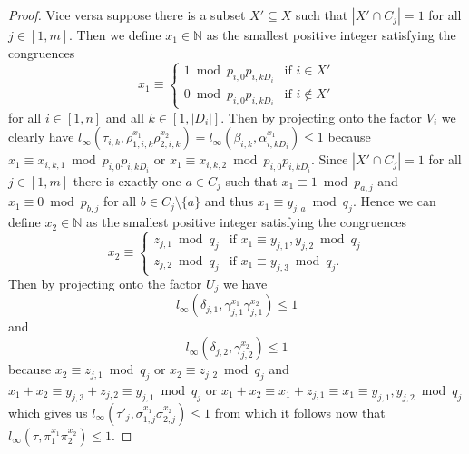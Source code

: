 \documentclass{article}
\begin{document}
\begin{proof}
Vice versa suppose there is a subset $X' \subseteq X$ such that $|X' \cap C_j| = 1$ for all $j \in [1,m]$. Then we define $x_1 \in \mathbb{N}$ as the smallest positive integer satisfying the congruences
\begin{displaymath}
x_1 \equiv \begin{cases}
1 \bmod p_{i,0}p_{i,kD_i} & \text{if } i \in X'\\
0 \bmod p_{i,0}p_{i,kD_i} & \text{if } i \not \in X'
\end{cases}
\end{displaymath}
for all $i \in [1,n]$ and all $k \in [1,|D_i|]$. Then by projecting onto the factor $V_i$ we clearly have $l_\infty(\tau_{i,k}, \rho_{1,i,k}^{x_1}\rho_{2,i,k}^{x_2}) = l_\infty(\beta_{i,k}, \alpha_{i,kD_i}^{x_1}) \leq 1$ because $x_1 \equiv x_{i,k,1} \bmod p_{i,0}p_{i,kD_i}$ or $x_1 \equiv x_{i,k,2} \bmod p_{i,0}p_{i,kD_i}$. Since $|X' \cap C_j| = 1$ for all $j \in [1,m]$ there is exactly one $a \in C_j$ such that $x_1 \equiv 1 \bmod p_{a,j}$ and $x_1 \equiv 0 \bmod p_{b,j}$ for all $b \in C_j \setminus \{a\}$ and thus $x_1 \equiv y_{j,a} \bmod q_j$. Hence we can define $x_2 \in \mathbb{N}$ as the smallest positive integer satisfying the congruences
\begin{displaymath}
x_2 \equiv \begin{cases}
z_{j,1} \bmod q_j & \text{if } x_1 \equiv y_{j,1},y_{j,2} \bmod q_j\\
z_{j,2} \bmod q_j & \text{if } x_1 \equiv y_{j,3} \bmod q_j.
\end{cases}
\end{displaymath}
Then by projecting onto the factor $U_j$ we have
\begin{displaymath}
l_\infty(\delta_{j,1}, \gamma_{j,1}^{x_1}\gamma_{j,1}^{x_2}) \leq 1
\end{displaymath}
and
\begin{displaymath}
l_\infty(\delta_{j,2}, \gamma_{j,2}^{x_2}) \leq 1
\end{displaymath}
because $x_2 \equiv z_{j,1} \bmod q_j$ or $x_2 \equiv z_{j,2} \bmod q_j$ and $x_1 + x_2 \equiv y_{j,3} + z_{j,2} \equiv y_{j,1} \bmod q_j$ or $x_1 + x_2 \equiv x_1 + z_{j,1} \equiv x_1 \equiv y_{j,1},y_{j,2} \bmod q_j$ which gives us $l_\infty(\tau'_j, \sigma_{1,j}^{x_1}\sigma_{2,j}^{x_2}) \leq 1$ from which it follows now that $l_\infty(\tau, \pi_1^{x_1}\pi_2^{x_2}) \leq 1$.
\end{proof}
\end{document}
